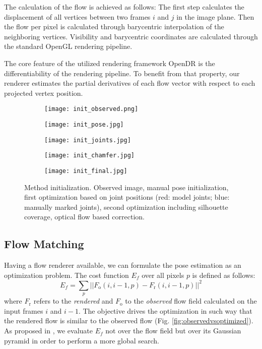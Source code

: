 \documentclass[10pt,twocolumn,letterpaper]{article}
\begin{document}
 The calculation of the flow is achieved as follows: The first step calculates the displacement of all vertices between two frames $i$ and $j$ in the image plane.
 Then the flow per pixel is calculated through barycentric interpolation of the neighboring vertices. Visibility and barycentric coordinates are calculated through the standard OpenGL rendering pipeline. 

The core feature of the utilized rendering framework OpenDR is the differentiability of the rendering pipeline. To benefit from that property, our renderer estimates the partial derivatives of each flow vector with respect to each projected vertex position. %

 \begin{figure*}
 	\centering
 	\begin{subfigure}[b]{0.2\textwidth}
 		\texttt{[image: init\_observed.png]}
 	\end{subfigure}%
 	\begin{subfigure}[b]{0.2\textwidth}
 		\texttt{[image: init\_pose.jpg]}
 	\end{subfigure}%
 	\begin{subfigure}[b]{0.2\textwidth}
 		\texttt{[image: init\_joints.jpg]}
 	\end{subfigure}%
 	\begin{subfigure}[b]{0.2\textwidth}
 		\texttt{[image: init\_chamfer.jpg]}
 	\end{subfigure}%
 	\begin{subfigure}[b]{0.2\textwidth}
 		\texttt{[image: init\_final.jpg]}
 	\end{subfigure}
 	\caption{Method initialization. Observed image, manual pose initialization, first optimization based on joint positions (red: model joints; blue: manually marked joints), second optimization including silhouette coverage, optical flow based correction.}
 	\label{fig:init}
 \end{figure*}

\subsection{Flow Matching}

Having a flow renderer available, we can formulate the pose estimation as an optimization problem. The cost function $E_f$ over all pixels $p$ is defined as follows:
\begin{equation}
E_f = \sum_{p}|| F_{\text{o}}(i, i-1, p) - F_{\text{r}}(i, i-1, p) ||^2
\end{equation}
\noindent where $F_{\text{r}}$ refers to the \emph{rendered} and $F_{\text{o}}$ to the \emph{observed} flow field calculated on the input frames $i$ and $i-1$. The objective drives the optimization in such way that the rendered flow is similar to the observed flow (Fig. \ref{fig:observedvsoptimized}). As proposed in \cite{loper2014opendr}, we evaluate $E_f$ not over the flow field but over its Gaussian pyramid in order to perform a more global search.
\end{document}
